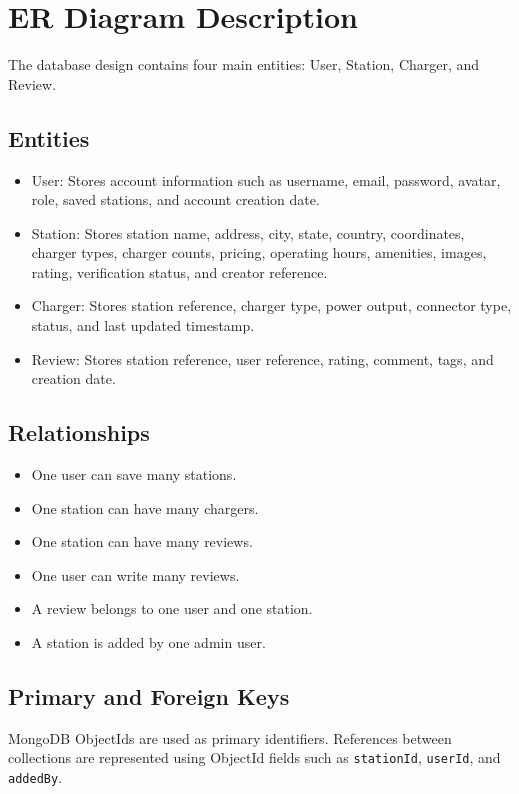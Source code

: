 \documentclass[12pt,a4paper]{article}
\begin{document}
\section{ER Diagram Description}

The database design contains four main entities: User, Station, Charger, and Review.

\subsection{Entities}

\begin{itemize}
  \item User: Stores account information such as username, email, password, avatar, role, saved stations, and account creation date.
  \item Station: Stores station name, address, city, state, country, coordinates, charger types, charger counts, pricing, operating hours, amenities, images, rating, verification status, and creator reference.
  \item Charger: Stores station reference, charger type, power output, connector type, status, and last updated timestamp.
  \item Review: Stores station reference, user reference, rating, comment, tags, and creation date.
\end{itemize}

\subsection{Relationships}

\begin{itemize}
  \item One user can save many stations.
  \item One station can have many chargers.
  \item One station can have many reviews.
  \item One user can write many reviews.
  \item A review belongs to one user and one station.
  \item A station is added by one admin user.
\end{itemize}

\subsection{Primary and Foreign Keys}

MongoDB ObjectIds are used as primary identifiers. References between collections are represented using ObjectId fields such as \texttt{stationId}, \texttt{userId}, and \texttt{addedBy}.
\end{document}

